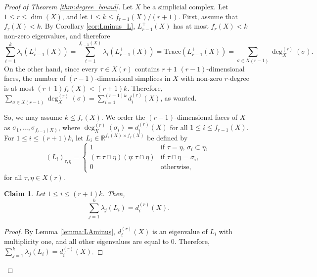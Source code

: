\documentclass[a4paper,11pt]{article}
\theoremstyle{plain}
\newtheorem{claim}[theorem]{\bf Claim}
\theoremstyle{definition}
\numberwithin{theorem}{section}
\numberwithin{equation}{section}
\newcommand{\Rea}{{\mathbb R}}
\begin{document}
\begin{proof}[Proof of Theorem \ref{thm:degree_bound}]

Let $X$ be a simplicial complex. Let $1\le r\le \dim(X)$, and let $1\le k\le f_{r-1}(X)/(r+1)$.
First, assume that $f_r(X)<k$. By Corollary \ref{cor:Lminus_L}, $L_{r-1}^+(X)$ has at most $f_r(X)<k$ non-zero eigenvalues, and therefore
\[
\sum_{i=1}^k \lambda_i(L^+_{r-1}(X))= \sum_{i=1}^{f_{r-1}(X)}\lambda_i(L_{r-1}^+(X)) =\text{Trace}(L_{r-1}^{+}(X))= \sum_{\sigma\in X(r-1)} \deg_X^{(r)}(\sigma).
\]
On the other hand, since every $\tau\in X(r)$ contains $r+1$ $(r-1)$-dimensional faces, the number of $(r-1)$-dimensional simplices in $X$ with non-zero $r$-degree is at most $(r+1)f_r(X)<(r+1)k$. Therefore, $\sum_{\sigma\in X(r-1)} \deg_X^{(r)}(\sigma)= \sum_{i=1}^{(r+1)k} d_i^{(r)}(X)$, as wanted. 

So, we may assume $k\le f_r(X)$. 
We order the $(r-1)$-dimensional faces of $X$ as $\sigma_1,\ldots,\sigma_{f_{r-1}(X)}$, where $\deg_X^{(r)}(\sigma_i)=d^{(r)}_i(X)$ for all $1\le i\le f_{r-1}(X)$. 
For $1\le i \le (r+1)k$, let $L_i\in \Rea^{f_r(X)\times f_r(X)}$ be defined by
\begin{equation}\label{eq:L_i_def}
    (L_i)_{\tau,\eta}=\begin{cases}
        1 & \text{if } \tau=\eta,\, \sigma_i\subset \eta,\\
        (\tau:\tau\cap\eta)(\eta:\tau\cap \eta) & \text{if } \tau\cap \eta=\sigma_i,
        \\  0 &\text{otherwise,}
    \end{cases}     
\end{equation}
for all $\tau,\eta\in X(r)$. 

\begin{claim}\label{claim:Li}
    Let $1\le i\le (r+1)k$. Then,
    \[
        \sum_{j=1}^k \lambda_j(L_i) = d_i^{(r)}(X).
    \]
\end{claim}
\begin{proof}
By Lemma \ref{lemma:LAminus}, $d^{(r)}_i(X)$ is an eigenvalue of $L_i$ with multiplicity one, and all other eigenvalues are equal to $0$. Therefore, $  \sum_{j=1}^k \lambda_j(L_i) = d_i^{(r)}(X)$.
\end{proof}



\end{proof}
\end{document}
